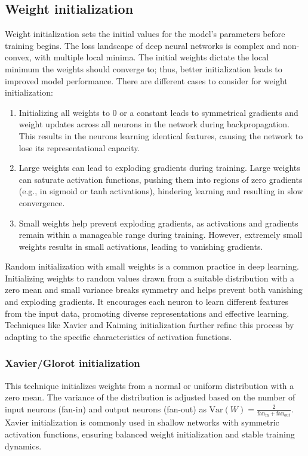 \subsection{Weight initialization}
Weight initialization sets the initial values for the model's parameters before training begins. The loss landscape of deep neural networks is complex and non-convex, with multiple local minima. The initial weights dictate the local minimum the weights should converge to; thus, better initialization leads to improved model performance. There are different cases to consider for weight initialization: 
\begin{enumerate}
\item Initializing all weights to 0 or a constant leads to symmetrical gradients and weight updates across all neurons in the network during backpropagation. This results in the neurons learning identical features, causing the network to lose its representational capacity.
\item Large weights can lead to exploding gradients during training. Large weights can saturate activation functions, pushing them into regions of zero gradients (e.g., in sigmoid or tanh activations), hindering learning and resulting in slow convergence.
\item Small weights help prevent exploding gradients, as activations and gradients remain within a manageable range during training. However, extremely small weights results in small activations, leading to vanishing gradients. 
\end{enumerate}
Random initialization with small weights is a common practice in deep learning. Initializing weights to random values drawn from a suitable distribution with a zero mean and small variance breaks symmetry and helps prevent both vanishing and exploding gradients. It encourages each neuron to learn different features from the input data, promoting diverse representations and effective learning. Techniques like Xavier and Kaiming initialization further refine this process by adapting to the specific characteristics of activation functions.
\subsubsection{Xavier/Glorot initialization}
This technique initializes weights from a normal or uniform distribution with a zero mean. The variance of the distribution is adjusted based on the number of input neurons (fan-in) and output neurons (fan-out) as $\text{Var}(W) = \frac{2}{\text{fan}_{\text{in}} + \text{fan}_{\text{out}}}$. Xavier initialization is commonly used in shallow networks with symmetric activation functions, ensuring balanced weight initialization and stable training dynamics. 
